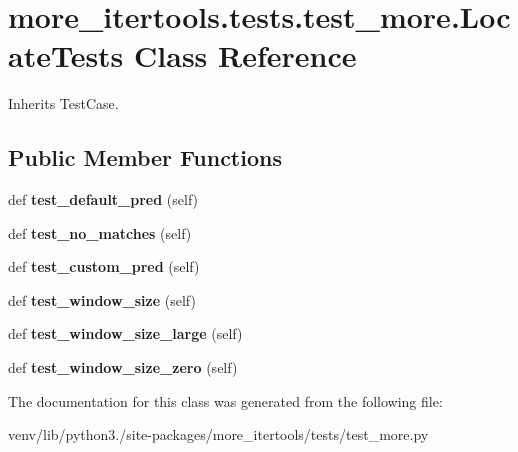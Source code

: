 \hypertarget{classmore__itertools_1_1tests_1_1test__more_1_1_locate_tests}{}\section{more\+\_\+itertools.\+tests.\+test\+\_\+more.\+Locate\+Tests Class Reference}
\label{classmore__itertools_1_1tests_1_1test__more_1_1_locate_tests}


Inherits Test\+Case.

\subsection*{Public Member Functions}
\begin{DoxyCompactItemize}
\item 
\mbox{\label{classmore__itertools_1_1tests_1_1test__more_1_1_locate_tests_a9db1e4590bbd38bed5e995ff4f808c61}} 
def {\bfseries test\+\_\+default\+\_\+pred} (self)
\item 
\mbox{\label{classmore__itertools_1_1tests_1_1test__more_1_1_locate_tests_a514be6662e4162a80aef9ca57f0ad913}} 
def {\bfseries test\+\_\+no\+\_\+matches} (self)
\item 
\mbox{\label{classmore__itertools_1_1tests_1_1test__more_1_1_locate_tests_ace964c45c79734182f100e5ed09afeec}} 
def {\bfseries test\+\_\+custom\+\_\+pred} (self)
\item 
\mbox{\label{classmore__itertools_1_1tests_1_1test__more_1_1_locate_tests_ae7624519ea6ee1c22e25c35c6dc30803}} 
def {\bfseries test\+\_\+window\+\_\+size} (self)
\item 
\mbox{\label{classmore__itertools_1_1tests_1_1test__more_1_1_locate_tests_add068301384703a3bba47656e5384956}} 
def {\bfseries test\+\_\+window\+\_\+size\+\_\+large} (self)
\item 
\mbox{\label{classmore__itertools_1_1tests_1_1test__more_1_1_locate_tests_af5f1780589af0e7015dfcbd9ade206d2}} 
def {\bfseries test\+\_\+window\+\_\+size\+\_\+zero} (self)
\end{DoxyCompactItemize}


The documentation for this class was generated from the following file\+:\begin{DoxyCompactItemize}
\item 
venv/lib/python3./site-\/packages/more\+\_\+itertools/tests/test\+\_\+more.\+py\end{DoxyCompactItemize}
